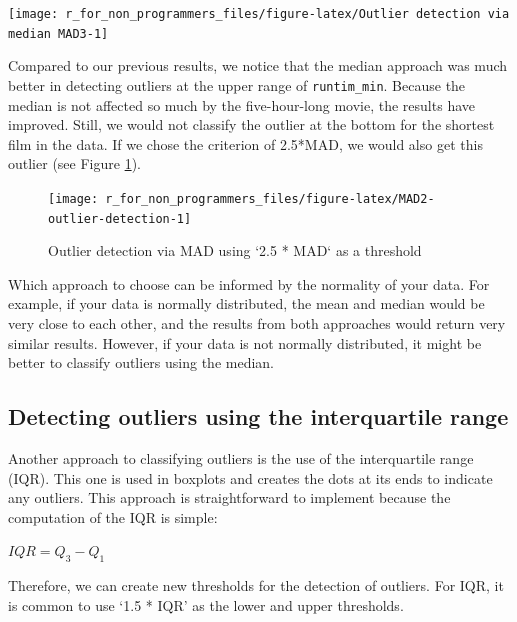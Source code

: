 \documentclass[
]{book}
\begin{document}
\begin{center}\texttt{[image: r\_for\_non\_programmers\_files/figure-latex/Outlier detection via median MAD3-1]} \end{center}

Compared to our previous results, we notice that the median approach was much better in detecting outliers at the upper range of \texttt{runtim\_min}. Because the median is not affected so much by the five-hour-long movie, the results have improved. Still, we would not classify the outlier at the bottom for the shortest film in the data. If we chose the criterion of 2.5*MAD, we would also get this outlier (see Figure \ref{fig:MAD2-outlier-detection}).

\begin{figure}

{\centering \texttt{[image: r\_for\_non\_programmers\_files/figure-latex/MAD2-outlier-detection-1]} 

}

\caption{Outlier detection via MAD using `2.5 * MAD` as a threshold}\label{fig:MAD2-outlier-detection}
\end{figure}

Which approach to choose can be informed by the normality of your data. For example, if your data is normally distributed, the mean and median would be very close to each other, and the results from both approaches would return very similar results. However, if your data is not normally distributed, it might be better to classify outliers using the median.

\hypertarget{outliers-iqr}{%
\subsection{Detecting outliers using the interquartile range}\label{outliers-iqr}}

Another approach to classifying outliers is the use of the interquartile range (IQR). This one is used in boxplots and creates the dots at its ends to indicate any outliers. This approach is straightforward to implement because the computation of the IQR is simple:

\leavevmode\hypertarget{iqr-formula}{}%
\(IQR = Q_{3}-Q_{1}\)

Therefore, we can create new thresholds for the detection of outliers. For IQR, it is common to use `1.5 * IQR' as the lower and upper thresholds.
\end{document}
